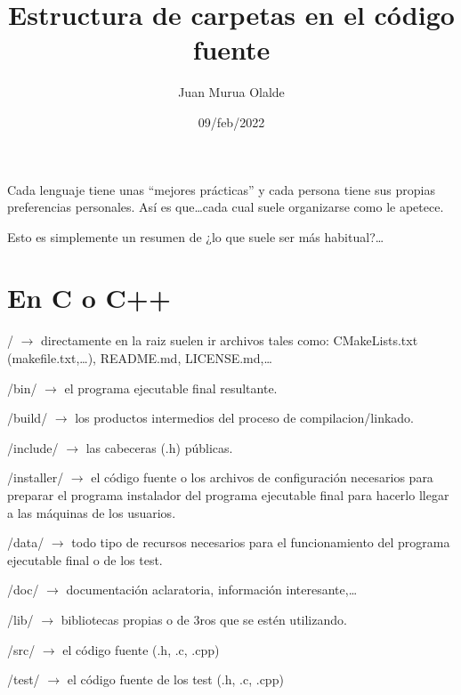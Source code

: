 \documentclass[spanish,12pt,a4paper,final,oneside]{article}
\title{Estructura de carpetas en el código fuente}
\author{Juan Murua Olalde}
\date{09/feb/2022}
\begin{document}
\begin{center}\begin{LARGE}
\MyTitle
\end{LARGE}\end{center}
\begin{footnotesize}
\end{footnotesize}

\hypersetup{linkcolor=black}

\vspace{1cm}

Cada lenguaje tiene unas ``mejores prácticas'' y cada persona tiene sus propias preferencias personales. Así es que\ldots cada cual suele organizarse como le apetece.

Esto es simplemente un resumen de ¿lo que suele ser más habitual?\ldots


\section*{En C o C++}

{\LARGE /} $\rightarrow$ directamente en la raiz suelen ir archivos tales como: CMakeLists.txt (makefile.txt,\ldots), README.md, LICENSE.md,\ldots 

{\LARGE /bin/} $\rightarrow$ el programa ejecutable final resultante.

{\LARGE /build/} $\rightarrow$ los productos intermedios del proceso de compilacion/linkado.

{\LARGE /include/} $\rightarrow$ las cabeceras (.h) públicas.

{\LARGE /installer/} $\rightarrow$ el código fuente o los archivos de configuración necesarios para preparar el programa instalador del programa ejecutable final para hacerlo llegar a las máquinas de los usuarios.

{\LARGE /data/} $\rightarrow$ todo tipo de recursos necesarios para el funcionamiento del programa ejecutable final o de los test.

{\LARGE /doc/} $\rightarrow$ documentación aclaratoria, información interesante,\ldots

{\LARGE /lib/} $\rightarrow$ bibliotecas propias o de 3ros que se estén utilizando.

{\LARGE /src/} $\rightarrow$ el código fuente (.h, .c, .cpp)

{\LARGE /test/} $\rightarrow$ el código fuente de los test (.h, .c, .cpp)
\end{document}
